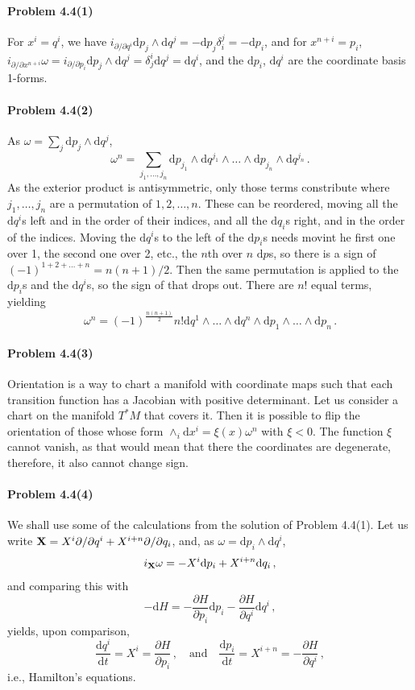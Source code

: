 \documentclass[a4paper,12pt]{article}
\def\d{\mathrm{d}}
\newcommand{\problem}[1]{\paragraph{Problem #1}}
\begin{document}

\problem{4.4(1)} For $x^i=q^i$, we have $i_{\partial/\partial q^i}\d p_j \wedge \d q^j = -\d p_j \delta^j_i = -\d p_i$, and for $x^{n+i} = p_i$, $i_{\partial/\partial x^{n+i}}\omega = i_{\partial/\partial p_i}\d p_j \wedge \d q^j = \delta^i_j \d q^j = \d q^i$, and the $\d p_i$, $\d q^i$ are the coordinate basis 1-forms.


\problem{4.4(2)} As $\omega = \sum_j \d p_j \wedge \d q^j$,
\[
 \omega^n = \sum_{j_1, \dots, j_n} \d p_{j_1}\wedge \d q^{j_1} \wedge \dots \wedge \d p_{j_n}\wedge \d q^{j_n}\,.
\]
As the exterior product is antisymmetric, only those terms constribute where $j_1,\dots, j_n$ are a permutation of $1,2,\dots,n$. These can be reordered, moving all the $\d q^i$s left and in the order of their indices, and all the $\d q_i$s right, and in the order of the indices. Moving the $\d q^i$s to the left of the $\d p_i$s needs movint he first one over 1, the second one over 2, etc., the $n$th over $n$ $\d p$s, so there is a sign of $(-1)^{1+2+\dots+n} = n(n+1)/2$. Then the same permutation is applied to the $\d p_i$s and the $\d q^i$s, so the sign of that drops out. There are $n{!}$ equal terms, yielding
\[
 \omega^n = (-1)^{\frac{n(n+1)}{2}} n! \d q^1 \wedge \dots\wedge \d q^n \wedge \d p_1\wedge\dots\wedge\d p_n\,.
\]


\problem{4.4(3)} Orientation is a way to chart a manifold with coordinate maps such that each transition function has a Jacobian with positive determinant. Let us consider a chart on the manifold $T^*M$ that covers it. Then it is possible to flip the orientation of those whose form $\wedge_i \d x^i = \xi(x) \omega^n$ with $\xi < 0$. The function $\xi$ cannot vanish, as that would mean that there the coordinates are degenerate, therefore, it also cannot change sign.


\problem{4.4(4)} We shall use some of the calculations from the solution of Problem 4.4(1). Let us write ${\bf X} = X^i\partial/\partial q^i + X^{i+n}\partial/\partial q_i$, and, as $\omega = \d p_i \wedge \d q^i$,
\[
 i_{\bf X}\omega  = -X^i \d p_i + X^{i+n} \d q_i\,,
\]
and comparing this with
\[
 -\d H = -\frac{\partial H}{\partial p_i}\d p_i - \frac{\partial H}{\partial q^i}\d q^i\,,
\]
yields, upon comparison,
\[
 \frac{\d q^i}{\d t} = X^i = \frac{\partial H}{\partial p_i}\,,\quad\text{and}\quad
 \frac{\d p_i}{\d t} = X^{i+n} = -\frac{\partial H}{\partial q^i}\,,
\]
i.e., Hamilton's equations.
\end{document}
